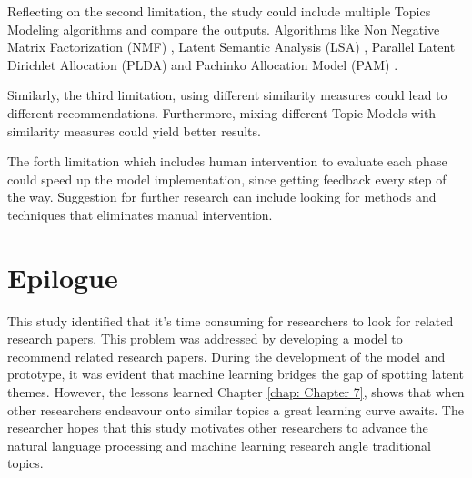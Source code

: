 Reflecting on the second limitation, the study could include multiple Topics Modeling algorithms and compare the outputs. Algorithms like Non Negative Matrix Factorization (NMF) \cite{Purpura2018}, Latent Semantic Analysis (LSA) \cite{Qomariyah2019}, Parallel Latent Dirichlet Allocation (PLDA) \cite{Mukherjee2019} and Pachinko Allocation Model (PAM) \cite{Koltcov2021}. 

Similarly, the third limitation, using different similarity measures could lead to different recommendations. Furthermore, mixing different Topic Models with similarity measures could yield better results.

The forth limitation which includes human intervention to evaluate each phase could speed up the model implementation, since getting feedback every step of the way. Suggestion for further research can include looking for methods and techniques that eliminates manual intervention.

\section{Epilogue}
This study identified that it's time consuming for researchers to look for related research papers. This problem was addressed by developing a model to recommend related research papers. During the development of the model and prototype, it was evident that machine learning bridges the gap of spotting latent themes. However, the lessons learned Chapter \ref{chap: Chapter 7}, shows that when other researchers endeavour onto similar topics a great learning curve awaits. The researcher hopes that this study motivates other researchers to advance the natural language processing and machine learning research angle traditional topics.


